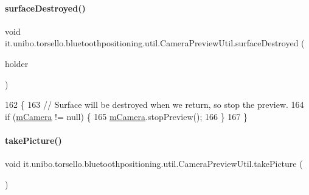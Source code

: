 \paragraph{\texorpdfstring{surface\+Destroyed()}{surfaceDestroyed()}}
{\footnotesize\ttfamily void it.\+unibo.\+torsello.\+bluetoothpositioning.\+util.\+Camera\+Preview\+Util.\+surface\+Destroyed (\begin{DoxyParamCaption}\item[{Surface\+Holder}]{holder }\end{DoxyParamCaption})}


\begin{DoxyCode}
162                                                        \{
163         \textcolor{comment}{// Surface will be destroyed when we return, so stop the preview.}
164         \textcolor{keywordflow}{if} (\hyperlink{classit_1_1unibo_1_1torsello_1_1bluetoothpositioning_1_1util_1_1CameraPreviewUtil_a7ee402da8ec64412f9a68e68b4025eea_a7ee402da8ec64412f9a68e68b4025eea}{mCamera} != null) \{
165             \hyperlink{classit_1_1unibo_1_1torsello_1_1bluetoothpositioning_1_1util_1_1CameraPreviewUtil_a7ee402da8ec64412f9a68e68b4025eea_a7ee402da8ec64412f9a68e68b4025eea}{mCamera}.stopPreview();
166         \}
167     \}
\end{DoxyCode}
\hypertarget{classit_1_1unibo_1_1torsello_1_1bluetoothpositioning_1_1util_1_1CameraPreviewUtil_a4f4ca8b7292c4e410f1f5aca3a53423a_a4f4ca8b7292c4e410f1f5aca3a53423a}{}\label{classit_1_1unibo_1_1torsello_1_1bluetoothpositioning_1_1util_1_1CameraPreviewUtil_a4f4ca8b7292c4e410f1f5aca3a53423a_a4f4ca8b7292c4e410f1f5aca3a53423a} 
\paragraph{\texorpdfstring{take\+Picture()}{takePicture()}}
{\footnotesize\ttfamily void it.\+unibo.\+torsello.\+bluetoothpositioning.\+util.\+Camera\+Preview\+Util.\+take\+Picture (\begin{DoxyParamCaption}{ }\end{DoxyParamCaption})}


